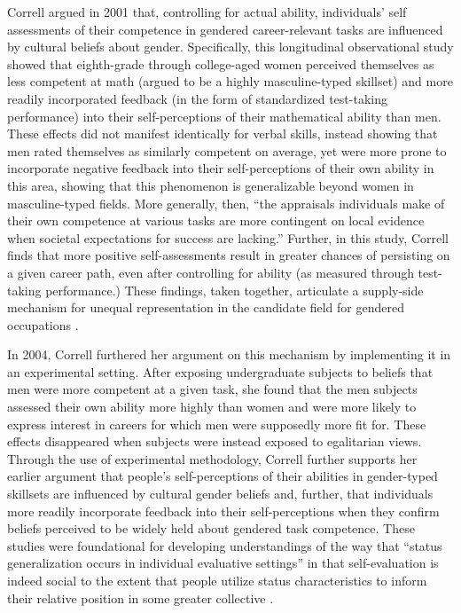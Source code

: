 Correll argued in 2001 that, controlling for actual ability, individuals’ self assessments of their competence in gendered career-relevant tasks are influenced by cultural beliefs about gender. Specifically, this longitudinal observational study showed that eighth-grade through college-aged women perceived themselves as less competent at math (argued to be a highly masculine-typed skillset) and more readily incorporated feedback (in the form of standardized test-taking performance) into their self-perceptions of their mathematical ability than men. These effects did not manifest identically for verbal skills, instead showing that men rated themselves as similarly competent on average, yet were more prone to incorporate negative feedback into their self-perceptions of their own ability in this area, showing that this phenomenon is generalizable beyond women in masculine-typed fields. More generally, then, ``the appraisals individuals make of their own competence at various tasks are more contingent on local evidence when societal expectations for success are lacking.'' Further, in this study, Correll finds that more positive self-assessments result in greater chances of persisting on a given career path, even after controlling for ability (as measured through test-taking performance.) These findings, taken together, articulate a supply-side mechanism for unequal representation in the candidate field for gendered occupations \cite{correll_gender_2001}.   

In 2004, Correll furthered her argument on this mechanism by implementing it in an experimental setting. After exposing undergraduate subjects to beliefs that men were more competent at a given task, she found that the men subjects assessed their own ability more highly than women and were more likely to express interest in careers for which men were supposedly more fit for. These effects disappeared when subjects were instead exposed to egalitarian views. Through the use of experimental methodology, Correll further supports her earlier argument that people’s self-perceptions of their abilities in gender-typed skillsets are influenced by cultural gender beliefs and, further, that individuals more readily incorporate feedback into their self-perceptions when they confirm beliefs perceived to be widely held about gendered task competence. These studies were foundational for developing understandings of the way that ``status generalization occurs in individual evaluative settings'' in that self-evaluation is indeed social to the extent that people utilize status characteristics to inform their relative position in some greater collective \cite{correll_constraints_2004}.  

